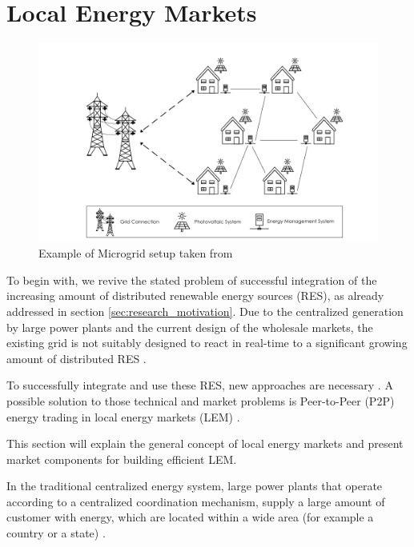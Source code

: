 \section{Local Energy Markets}
\label{sec:lem}

\begin{figure}[htbp]
	\centering
	\includegraphics[width=.9\linewidth]{./figures/microgrid_1024x.png}
	\caption{Example of Microgrid setup taken from \protect{}}
	\label{figure:microgrid}
\end{figure}

To begin with, we revive the stated problem of successful integration of the increasing amount of
distributed renewable energy sources (RES), as already addressed 
in section \ref{sec:research_motivation}. Due to the centralized generation by large power plants
and the current design of the wholesale markets, the existing grid is not suitably designed
to react in real-time to a significant growing 
amount of distributed RES  .

To successfully integrate and use these RES, new approaches are necessary .
A possible solution to those technical and market problems is Peer-to-Peer (P2P) energy 
trading in local energy markets (LEM) . 

This section will explain the general concept of local energy markets 
and present market components for building efficient LEM. 

In the traditional centralized energy system, large power plants that operate according to a
centralized coordination mechanism, supply a large amount of customer with energy, which are located 
within a wide area (for example a country or a state) .

